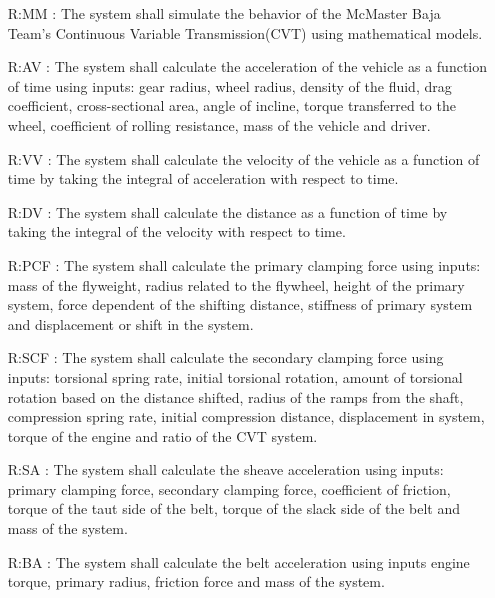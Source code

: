 \documentclass[12pt]{article}
\begin{document}
\noindent \begin{itemize}

\item[R:MM \label{R:MM}:] The system shall simulate the behavior of the McMaster Baja Team's Continuous Variable Transmission(CVT) using mathematical models.

\item[R:AV \label{R:AV}:] The system shall calculate the acceleration of the vehicle as a function of time using inputs: gear radius, wheel radius, density of the fluid, drag coefficient, cross-sectional area, angle of incline, torque transferred to the wheel, coefficient of rolling resistance, mass of the vehicle and driver. 

\item[R:VV \label{R:VV}:] The system shall calculate the velocity of the vehicle as a function of time by taking the integral of acceleration with respect to time.

\item[R:DV \label{R:DV}:] The system shall calculate the distance as a function of time by taking the integral of the velocity with respect to time.

\item[R:PCF \label{R:PCF}:] The system shall calculate the primary clamping force using inputs: mass of the flyweight, radius related to the flywheel, height of the primary system, force dependent of the shifting distance, stiffness of primary system and displacement or shift in the system. 

\item[R:SCF \label{R:SCF}:] The system shall calculate the secondary clamping force using inputs: torsional spring rate, initial torsional rotation, amount of torsional rotation based on the distance shifted, radius of the ramps from the shaft, compression spring rate, initial compression distance, displacement in system, torque of the engine and ratio of the CVT system.

\item[R:SA \label{R:SA}:] The system shall calculate the sheave acceleration using inputs: primary clamping force, secondary clamping force, coefficient of friction, torque of the taut side of the belt, torque of the slack side of the belt and mass of the system. 

\item[R:BA \label{R:BA}:] The system shall calculate the belt acceleration using inputs engine torque, primary radius, friction force and mass of the system. 


\end{itemize}
\end{document}
